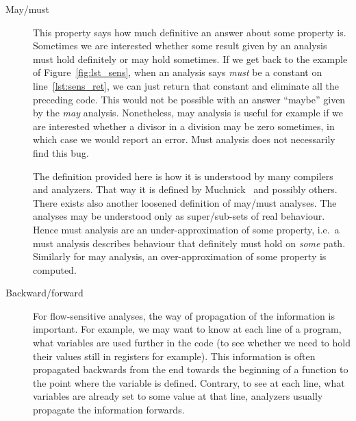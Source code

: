 \begin{description}
\item[May/must] This property says how much definitive an answer about some
property is. Sometimes we are interested whether some result given by an
analysis must hold definitely or may hold sometimes. If we get back to the
example of Figure~\ref{fig:lst_sens}, when an analysis says 
\emph{must} be a constant on line~\ref{lst:sens_ret}, we can just return that
constant and eliminate all the preceding code. This would not be possible with
an answer ``maybe'' given by the \emph{may} analysis. Nonetheless, may
analysis is useful for example if we are interested whether a divisor in a
division may be zero sometimes, in which case we would report an error.  Must
analysis does not necessarily find this bug.

The definition provided here is how it is understood by many compilers and
analyzers. That way it is defined by Muchnick~\cite{muchnick} and possibly
others.  There exists also another loosened definition of may/must analyses.
The analyses may be understood only as super/sub-sets of real behaviour. Hence
must analysis are an under-approximation of some property, i.e.\ a must
analysis describes behaviour that definitely must hold on \emph{some} path.
Similarly for may analysis, an over-approximation of some property is
computed.

\item[Backward/forward] For flow-sensitive analyses, the way of propagation of
the information is important.  For example, we may want to know at each line
of a program, what variables are used further in the code (to see whether we
need to hold their values still in registers for example). This information is
often propagated backwards from the end towards the beginning of a function
to the point where the variable is defined.  Contrary, to see at each line,
what variables are already set to some value at that line, analyzers usually
propagate the information forwards.

\end{description}

